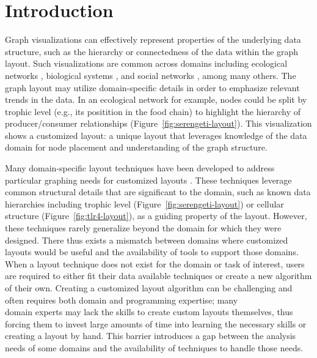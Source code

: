 \section{Introduction}
Graph visualizations can effectively represent properties of the underlying data structure, such as the hierarchy or connectedness of the data within the graph layout. Such visualizations are common across domains including ecological networks \cite{hinke2004visualizing,harper2006dynamic,lavigne1996cod,baskerville2011spatial,yodzis1998local,cohen2003ecological,kearney2016blog,benson2016higher}, biological systems \cite{barsky2008cerebral,shannon2003cytoscape,gehlenborg2010visualization,saraiya2005visualizing,becker2001graph}, and social networks \cite{rothenberg1998using} , among many others. The graph layout may utilize domain-specific details in order to emphasize relevant trends in the data. In an ecological network for example, nodes could be split by trophic level (e.g., its positition in the food chain) to highlight the hierarchy of producer/consumer relationships (Figure~\ref{fig:serengeti-layout}). This visualization shows a customized layout: a unique layout that leverages knowledge of the data domain for node placement and understanding of the graph structure.

Many domain-specific layout techniques have been developed to address particular graphing needs for customized layouts \cite{barsky2008cerebral,shannon2003cytoscape,kearney2017d3,kearney2017ecopath}. These techniques leverage common structural details that are significant to the domain, such as known data hierarchies including trophic level (Figure~\ref{fig:serengeti-layout}) or cellular structure (Figure~\ref{fig:tlr4-layout}), as a guiding property of the layout. However, these techniques rarely generalize beyond the domain for which they were designed. There thus exists a mismatch between domains where customized layouts would be useful and the availability of tools to support those domains. When a layout technique does not exist for the domain or task of interest, users are required to either fit their data available techniques or create a new algorithm of their own. Creating a customized layout algorithm can be challenging and often requires both domain and programming expertise; many
\serengetiLayoutColumn
\\domain experts may lack the skills to create custom layouts themselves, thus forcing them to invest large amounts of time into learning the necessary skills or creating a layout by hand. This barrier introduces a gap between the analysis needs of some domains and the availability of techniques to handle those needs.


